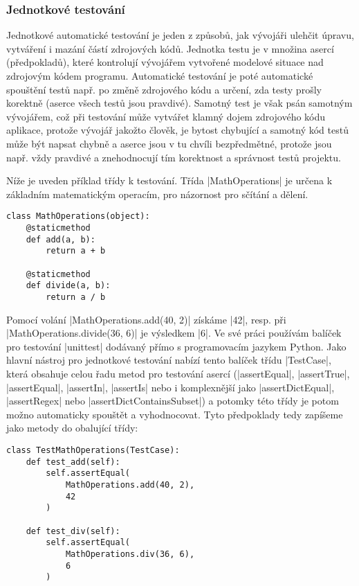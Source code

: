 \subsubsection{Jednotkové testování}

Jednotkové automatické testování je jeden z způsobů, jak vývojáři ulehčit úpravu, vytváření i mazání částí zdrojových kódů. Jednotka testu je v množina asercí (předpokladů), které kontrolují vývojářem vytvořené modelové situace nad zdrojovým kódem programu. Automatické testování je poté automatické spouštění testů např. po změně zdrojového kódu a určení, zda testy prošly korektně (aserce všech testů jsou pravdivé). Samotný test je však psán samotným vývojářem, což při testování může vytvářet klamný dojem  zdrojového kódu aplikace, protože vývojář jakožto člověk, je bytost chybující a samotný kód testů může být napsat chybně a aserce jsou v tu chvíli bezpředmětné, protože jsou např. vždy pravdivé a znehodnocují tím korektnost a správnost testů projektu.

Níže je uveden příklad třídy k testování. Třída \ic|MathOperations| je určena k základním matematickým operacím, pro názornost pro sčítání a dělení. 
\begin{lstlisting}[caption={Příklad třídy $MathOperations$ k testování}]
class MathOperations(object):
	@staticmethod
	def add(a, b):
		return a + b

	@staticmethod
	def divide(a, b):
		return a / b
\end{lstlisting}

\begin{sloppypar}
	Pomocí volání \ic|MathOperations.add(40, 2)| získáme \ic|42|, resp. při \ic|MathOperations.divide(36, 6)| je výsledkem \ic|6|. Ve své práci používám balíček pro testování \ic|unittest| dodávaný přímo s programovacím jazykem Python. Jako hlavní nástroj pro jednotkové testování nabízí tento balíček třídu \ic|TestCase|, která obsahuje celou řadu metod pro testování asercí (\ic|assertEqual|, \ic|assertTrue|, \ic|assertEqual|, \ic|assertIn|, \ic|assertIs| nebo i komplexnější jako \ic|assertDictEqual|, \ic|assertRegex| nebo \ic|assertDictContainsSubset|) a potomky této třídy je potom možno automaticky spouštět a vyhodnocovat. Tyto předpoklady tedy zapíšeme jako metody do obalující třídy:
\end{sloppypar}

\begin{lstlisting}[caption={Základní TestCase pro třídu $MathOperations$}]
class TestMathOperations(TestCase):
	def test_add(self):
		self.assertEqual(
			MathOperations.add(40, 2),
			42
		)

	def test_div(self):
		self.assertEqual(
			MathOperations.div(36, 6),
			6
		)
\end{lstlisting}

